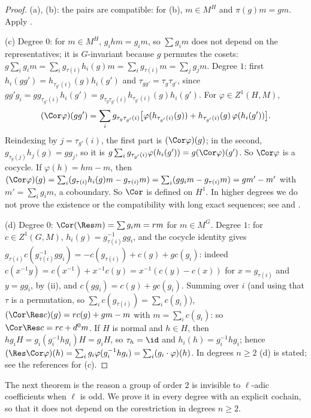 \begin{proof}
(a), (b): the pairs are compatible: for (b), $m\in M^H$ and $\pi(g)m=gm$. Apply .

(c) Degree $0$: for $m\in M^H$, $g_ihm=g_im$, so $\sum g_im$ does not depend on the representatives; it is $G$-invariant because $g$ permutes the cosets:
$g\sum_ig_im=\sum_ig_{\tau(i)}h_i(g)m=\sum_ig_{\tau(i)}m=\sum_jg_jm$.
Degree $1$: first $h_i(gg')=h_{\tau_{g'}(i)}(g)h_i(g')$ and $\tau_{gg'}=\tau_g\tau_{g'}$, since $gg'g_i=gg_{\tau_{g'}(i)}h_i(g')=g_{\tau_g\tau_{g'}(i)}h_{\tau_{g'}(i)}(g)h_i(g')$. For
$\varphi\in Z^1(H,M)$,
\[
(\Cor\varphi)(gg')=\sum_ig_{\tau_g\tau_{g'}(i)}\bigl[\varphi(h_{\tau_{g'}(i)}(g))+h_{\tau_{g'}(i)}(g)\,\varphi(h_i(g'))\bigr].
\]
Reindexing by $j=\tau_{g'}(i)$, the first part is $(\Cor\varphi)(g)$; in the second, $g_{\tau_g(j)}h_j(g)=gg_j$, so it is $g\sum_ig_{\tau_{g'}(i)}\varphi(h_i(g'))=g(\Cor\varphi)(g')$.
So $\Cor\varphi$ is a cocycle. If $\varphi(h)=hm-m$, then $(\Cor\varphi)(g)=\sum_i(g_{\tau(i)}h_i(g)m-g_{\tau(i)}m)=\sum_i(gg_im-g_{\tau(i)}m)=gm'-m'$ with $m'=\sum_ig_im$, a
coboundary. So $\Cor$ is defined on $H^1$. In higher degrees we do not prove the existence or the compatibility with long exact sequences; see
\cite[Chapter III, Section 9]{Brown} and \cite[Chapter I, Section 5]{NSW}.

(d) Degree $0$: $\Cor(\Res m)=\sum g_im=rm$ for $m\in M^G$. Degree $1$: for $c\in Z^1(G,M)$, $h_i(g)=g_{\tau(i)}^{-1}gg_i$, and the cocycle identity gives
$g_{\tau(i)}c(g_{\tau(i)}^{-1}gg_i)=-c(g_{\tau(i)})+c(g)+gc(g_i)$: indeed $c(x^{-1}y)=c(x^{-1})+x^{-1}c(y)=x^{-1}(c(y)-c(x))$ for $x=g_{\tau(i)}$ and $y=gg_i$, by
(ii), and $c(gg_i)=c(g)+gc(g_i)$. Summing over $i$ (and using that $\tau$ is a permutation, so $\sum_ic(g_{\tau(i)})=\sum_ic(g_i)$),
$(\Cor\Res c)(g)=rc(g)+gm-m$ with $m=\sum_ic(g_i)$: so $\Cor\Res c=rc+d^0m$. If $H$ is normal and $h\in H$, then $hg_iH=g_i(g_i^{-1}hg_i)H=g_iH$, so $\tau_h=\id$ and
$h_i(h)=g_i^{-1}hg_i$; hence $(\Res\Cor\varphi)(h)=\sum_ig_i\varphi(g_i^{-1}hg_i)=\sum_i(g_i\cdot\varphi)(h)$. In degrees $n\ge2$ (d) is stated; see the references
for (c).
\end{proof}

The next theorem is the reason a group of order $2$ is invisible to $\ell$-adic coefficients when $\ell$ is odd. We prove it in every degree with an
explicit cochain, so that it does not depend on the corestriction in degrees $n\ge2$.

